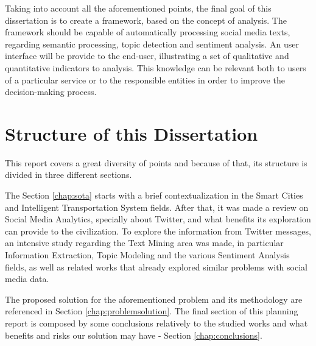 Taking into account all the aforementioned points, the final goal of this dissertation is to create a framework, based on the concept of analysis. The framework should be capable of automatically processing social media texts, regarding semantic processing, topic detection and sentiment analysis. An user interface will be provide to the end-user, illustrating a set of qualitative and quantitative indicators to analysis. This knowledge can be relevant both to users of a particular service or to the responsible entities in order to improve the decision-making process.

\section{Structure of this Dissertation} \label{sec:struct}
This report covers a great diversity of points and because of that, its structure is divided in three different sections.

The Section \ref{chap:sota} starts with a brief contextualization in the Smart Cities and Intelligent Transportation System fields. After that, it was made a review on Social Media Analytics, specially about Twitter, and what benefits its exploration can provide to the civilization. To explore the information from Twitter messages, an intensive study regarding the Text Mining area was made, in particular Information Extraction, Topic Modeling and the various Sentiment Analysis fields, as well as related works that already explored similar problems with social media data.

The proposed solution for the aforementioned problem and its methodology are referenced in Section \ref{chap:problemsolution}. The final section of this planning report is composed by some conclusions relatively to the studied works and what benefits and risks our solution may have - Section \ref{chap:conclusions}.

